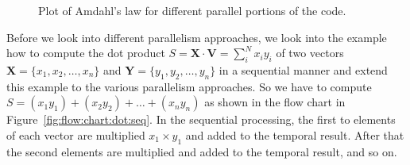 \documentclass[11pt,fleqn]{book} %
\begin{document}
\begin{figure}[tb]
\centering
\caption{Plot of Amdahl's law for different parallel portions of the code.}
\label{fig:amdals:law}
\end{figure}

Before we look into different parallelism approaches, we look into the example how to compute the dot product $S = \mathbf{X} \cdot \mathbf{V} = \sum_i^N x_i y_i$ of two vectors $\mathbf{X} = \lbrace x_1,x_2,\ldots,x_n \rbrace$ and $\mathbf{Y} = \lbrace y_1,y_2,\ldots,y_n \rbrace$  in a sequential manner and extend this example to the various parallelism approaches. So we have to compute $S = (x_1y_1) + (x_2y_2) + \ldots + (x_n y_n)$ as shown in the flow chart in Figure~\ref{fig:flow:chart:dot:seq}. In the sequential processing, the first to elements of each vector are multiplied $x_1 \times y_1$ and added to the temporal result. After that the second elements are multiplied and added to the temporal result, and so on. \\
\end{document}
